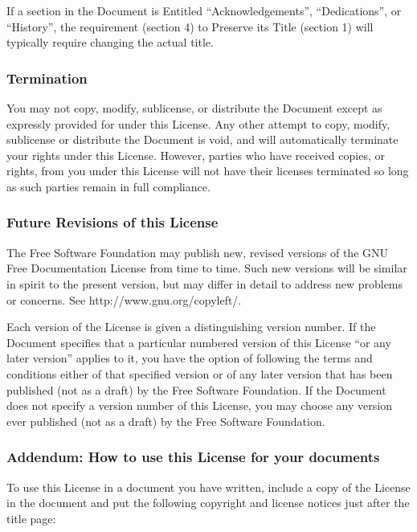 If a section in the Document is Entitled ``Acknowledgements'', ``Dedications'',
or ``History'', the requirement (section 4) to Preserve its Title (section 1)
will typically require changing the actual title.


\subsubsection{Termination}

You may not copy, modify, sublicense, or distribute the Document except as
expressly provided for under this License.  Any other attempt to copy, modify,
sublicense or distribute the Document is void, and will automatically terminate
your rights under this License.  However, parties who have received copies, or
rights, from you under this License will not have their licenses terminated so
long as such parties remain in full compliance.


\subsubsection{Future Revisions of this License}

The Free Software Foundation may publish new, revised versions of the GNU Free
Documentation License from time to time.  Such new versions will be similar in
spirit to the present version, but may differ in detail to address new problems
or concerns.  See http://www.gnu.org/copyleft/.

Each version of the License is given a distinguishing version number. If the
Document specifies that a particular numbered version of this License ``or any
later version'' applies to it, you have the option of following the terms and
conditions either of that specified version or of any later version that has
been published (not as a draft) by the Free Software Foundation.  If the
Document does not specify a version number of this License, you may choose any
version ever published (not as a draft) by the Free Software Foundation.


\subsubsection{Addendum: How to use this License for your documents}

To use this License in a document you have written, include a copy of the
License in the document and put the following copyright and license notices
just after the title page:

